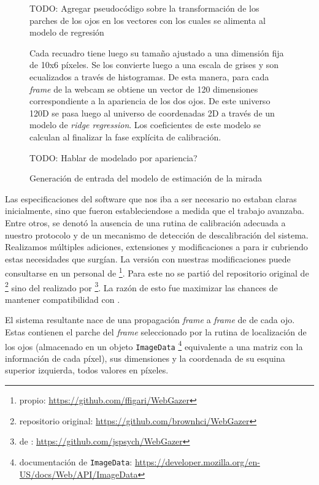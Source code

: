   \begin{figure}
    TODO: Agregar pseudocódigo sobre la transformación de los parches de los ojos
          en los vectores con los cuales se alimenta al modelo de regresión

  Cada recuadro tiene luego su tamaño ajustado a una dimensión fija de 10x6
  píxeles.
  Se los convierte luego a una escala de grises y son ecualizados a través de
  histogramas.
  De esta manera, para cada \textit{frame} de la webcam se obtiene un vector de
  120 dimensiones correspondiente a la apariencia de los dos ojos.
  De este universo 120D se pasa luego al universo de coordenadas 2D a través de
  un modelo de \textit{ridge regression}.
  Los coeficientes de este modelo se calculan al finalizar la fase explícita de
  calibración.

    TODO: Hablar de modelado por apariencia?

    \caption{Generación de entrada del modelo de estimación de la mirada}
    \label{fig:eye-features-to-model-input}
  \end{figure}

  Las especificaciones del software que nos iba a ser necesario no estaban claras
  inicialmente, sino que fueron estableciendose a medida que el trabajo avanzaba.
  Entre otros, se denotó la ausencia de una rutina de calibración adecuada a
  nuestro protocolo y de un mecanismo de detección de descalibración del sistema.
  Realizamos múltiples adiciones, extensiones y modificaciones a \webgazer para
  ir cubriendo estas necesidades que surgían.
  La versión con nuestras modificaciones puede consultarse en un \fork
  personal de \webgazer \footnote{\fork propio:
  \url{https://github.com/ffigari/WebGazer}}.
  Para este \fork no se partió del repositorio original de \webgazer
  \footnote{repositorio original: \url{https://github.com/brownhci/WebGazer}}
  sino del \fork realizado por \jspsych \footnote{\fork de \jspsych:
  \url{https://github.com/jspsych/WebGazer}}.
  La razón de esto fue maximizar las chances de mantener compatibilidad con
  \jspsych.

  El sistema resultante nace de una propagación \textit{frame} a \textit{frame}
  de \features de cada ojo.
  Estas contienen el parche del \textit{frame} seleccionado por la rutina de
  localización de los ojos (almacenado en un objeto \texttt{ImageData}
  \footnote{documentación de \texttt{ImageData}:
  \url{https://developer.mozilla.org/en-US/docs/Web/API/ImageData}} equivalente a
  una matriz con la información de cada píxel), sus dimensiones y la coordenada
  de su esquina superior izquierda, todos valores en píxeles.

